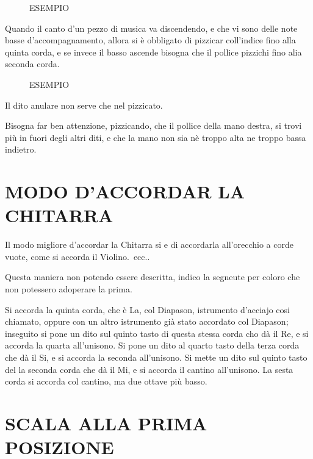\documentclass[a4paper]{book}
\begin{document}
\begin{figure}[h]
  \centering
  \caption{ESEMPIO}
  \label{fig:right-hand-1}
\end{figure}

Quando il canto d'un pezzo di musica va discendendo, e che vi sono delle note basse d'accompagnamento, allora si è obbligato di pizzicar coll'indice fino alla quinta corda, e se invece il basso ascende bisogna che il pollice pizzichi fino alia seconda corda.

\begin{figure}[h]
  \centering
  \caption{ESEMPIO}
  \label{fig:right-hand-2}
\end{figure}

Il dito anulare non serve che nel pizzicato.

Bisogna far ben attenzione, pizzicando, che il pollice della mano destra, si trovi più in fuori degli altri diti, e che la mano non sia nè troppo alta ne troppo bassa indietro.
\clearpage

\chapter[Il modo di accordarla]{MODO D'ACCORDAR LA CHITARRA}

Il modo migliore d'accordar la Chitarra si e di accordarla all'orecchio a corde vuote, come si accorda il Violino.\ ecc..

Questa maniera non potendo essere descritta, indico la segneute per coloro che non potessero adoperare la prima.


Si accorda la quinta corda, che è La, col Diapason, istrumento d'acciajo cosi chiamato, oppure con un altro istrumento già stato accordato col Diapason; inseguito si pone un dito sul quinto tasto di questa stessa corda cho dà il Re, e si accorda la quarta all'unisono.  Si pone un dito al quarto tasto della terza corda che dà il Si, e si accorda la seconda all'unisono.  Si mette un dito sul quinto tasto del la seconda corda che dà il Mi, e si accorda il cantino all'unisono.  La sesta corda si accorda col cantino, ma due ottave più basso.

\chapter[La scala e gli esercizj per imparar a leggere le note alle
prima posizione]{%
  SCALA ALLA PRIMA POSIZIONE}
\end{document}

